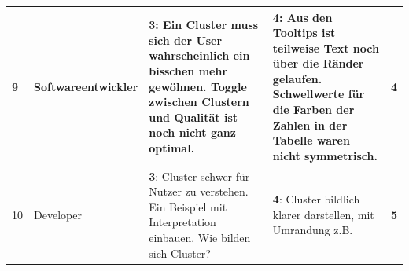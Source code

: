 \documentclass[
	english,
	ruledheaders=section,%
	class=report,%
	thesis={type=bachelor},%
	accentcolor=1b,%
	custommargins=true,%
	marginpar=false,%
	parskip=half-,%
	fontsize=11pt,%
	DIV=14,
]{tudapub}
\begin{document}
\begin{longtable}{l >{\RaggedRight}p{3cm} >{\RaggedRight}p{3.5cm} >{\RaggedRight}p{3.5cm} >{\RaggedRight}p{3.5cm}}
    \midrule
    9 & Softwareentwickler & \textbf{3}: Ein Cluster muss sich der User wahrscheinlich ein bisschen mehr gewöhnen. Toggle zwischen Clustern und Qualität ist noch nicht ganz optimal. & \textbf{4}: Aus den Tooltips ist teilweise Text noch über die Ränder gelaufen. Schwellwerte für die Farben der Zahlen in der Tabelle waren nicht symmetrisch. & \textbf{4} \\
    \midrule
    10 & Developer & \textbf{3}: Cluster schwer für Nutzer zu verstehen. Ein Beispiel mit Interpretation einbauen. Wie bilden sich Cluster? & \textbf{4}: Cluster bildlich klarer darstellen, mit Umrandung z.B. & \textbf{5} \\
\end{longtable}

\clearpage

\end{document}
